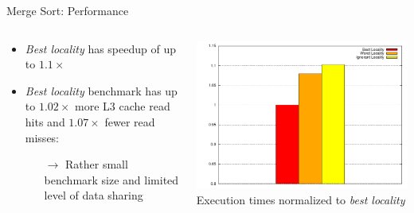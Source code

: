 \begin{frame}{Merge Sort: Performance}
  \begin{columns}[c]
    \begin{column}{0.49\textwidth}
      \begin{itemize}
      \item \emph{Best locality} has speedup of up to $1.1\times$
      \item \emph{Best locality} benchmark has up to $1.02\times$ more
        L3 cache read hits and $1.07\times$ fewer read misses:
        \begin{itemize}
        \item[$\rightarrow$] Rather small benchmark size and limited
          level of data sharing
        \end{itemize}
      \end{itemize}
    \end{column}
    \begin{column}{0.51\textwidth}
      \begin{center}
        \includegraphics[width=\textwidth]{figures/mergesort} \\
        \tiny{Execution times normalized to \emph{best locality}}
      \end{center}
    \end{column}
  \end{columns}
\end{frame}

